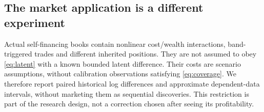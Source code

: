 

\subsection{The market application is a different experiment}

Actual self-financing books contain nonlinear cost/wealth interactions,
band-triggered trades and different inherited positions. They are not assumed
to obey \eqref{eq:latent} with a known bounded latent difference. Their costs
are scenario assumptions, without calibration observations satisfying
\eqref{eq:coverage}. We therefore report paired historical log differences
and approximate dependent-data intervals, without marketing them as sequential
discoveries. This restriction is part of the research design, not a correction
chosen after seeing its profitability.
